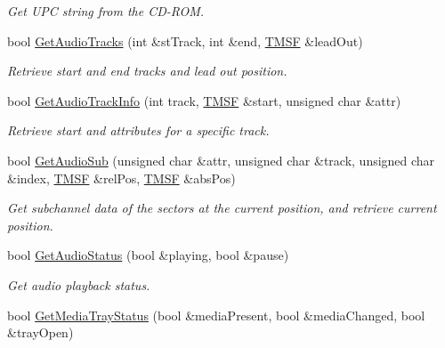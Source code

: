 \begin{DoxyCompactItemize}
\begin{DoxyCompactList}\small\item\em Get U\-P\-C string from the C\-D-\/\-R\-O\-M. \end{DoxyCompactList}\item 
bool \hyperlink{classCDROM__Interface__Image_a4aae5ec2ba0011a4f2281bb312aa49c3}{Get\-Audio\-Tracks} (int \&st\-Track, int \&end, \hyperlink{structSMSF}{T\-M\-S\-F} \&lead\-Out)
\begin{DoxyCompactList}\small\item\em Retrieve start and end tracks and lead out position. \end{DoxyCompactList}\item 
\hypertarget{classCDROM__Interface__Image_a1a1c42c11d483e82f41c6012f5f7d602}{bool \hyperlink{classCDROM__Interface__Image_a1a1c42c11d483e82f41c6012f5f7d602}{Get\-Audio\-Track\-Info} (int track, \hyperlink{structSMSF}{T\-M\-S\-F} \&start, unsigned char \&attr)}\label{classCDROM__Interface__Image_a1a1c42c11d483e82f41c6012f5f7d602}

\begin{DoxyCompactList}\small\item\em Retrieve start and attributes for a specific track. \end{DoxyCompactList}\item 
\hypertarget{classCDROM__Interface__Image_a11ba4965b5dd42015aff3d9f4b607abc}{bool \hyperlink{classCDROM__Interface__Image_a11ba4965b5dd42015aff3d9f4b607abc}{Get\-Audio\-Sub} (unsigned char \&attr, unsigned char \&track, unsigned char \&index, \hyperlink{structSMSF}{T\-M\-S\-F} \&rel\-Pos, \hyperlink{structSMSF}{T\-M\-S\-F} \&abs\-Pos)}\label{classCDROM__Interface__Image_a11ba4965b5dd42015aff3d9f4b607abc}

\begin{DoxyCompactList}\small\item\em Get subchannel data of the sectors at the current position, and retrieve current position. \end{DoxyCompactList}\item 
\hypertarget{classCDROM__Interface__Image_a5151e50027294571fafb414d751ca332}{bool \hyperlink{classCDROM__Interface__Image_a5151e50027294571fafb414d751ca332}{Get\-Audio\-Status} (bool \&playing, bool \&pause)}\label{classCDROM__Interface__Image_a5151e50027294571fafb414d751ca332}

\begin{DoxyCompactList}\small\item\em Get audio playback status. \end{DoxyCompactList}\item 
\hypertarget{classCDROM__Interface__Image_a8c5afdabeea94743f487fae4623eacac}{bool \hyperlink{classCDROM__Interface__Image_a8c5afdabeea94743f487fae4623eacac}{Get\-Media\-Tray\-Status} (bool \&media\-Present, bool \&media\-Changed, bool \&tray\-Open)}\label{classCDROM__Interface__Image_a8c5afdabeea94743f487fae4623eacac}


\end{DoxyCompactItemize}
